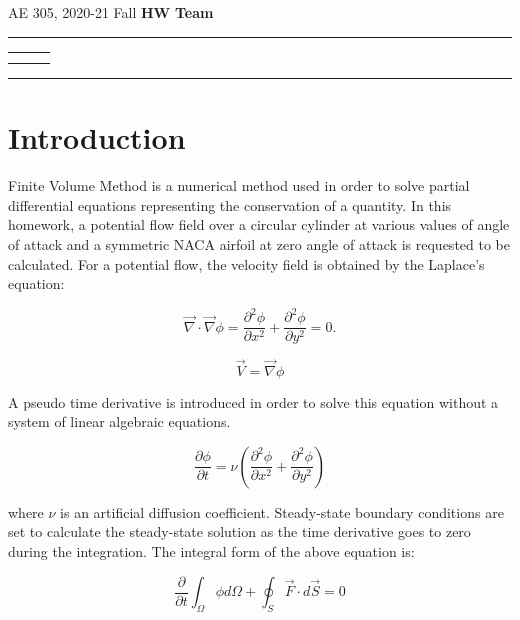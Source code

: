 \documentclass[letterpaper,12pt]{article}
\begin{document}
\begin{center}
AE 305, 2020-21 Fall \hfill \textbf{HW \HWno} \hfill \textbf{Team \TeamNo} \\
\noindent\rule{\textwidth}{0.4pt}
\begin{tabular}{p{} | p{} | p{} }
	\AuthorOneName&\AuthorTwoName&\AuthorThreeName\\
	\textit{\AuthorOneID}&\textit{\AuthorTwoID}&\textit{\AuthorThreeID}
\end{tabular}
\noindent\rule{\textwidth}{0.4pt}
\end{center}


\section{Introduction}
\label{section:intro}

Finite Volume Method is a numerical method used in order to solve partial differential
equations representing the conservation of a quantity. In this homework, a potential flow
field over a circular cylinder at various values of angle of attack and a symmetric NACA
airfoil at zero angle of attack is requested to be calculated. For a potential flow,
the velocity field is obtained by the Laplace's equation:

\begin{equation}
	\vec{\nabla} \cdot \vec{\nabla}\phi = \frac{\partial^2 \phi}{\partial x^2} + \frac{\partial^2 \phi}{\partial y^2} = 0.
\end{equation}

\begin{equation}
\vec{V} = \vec{\nabla}\phi
\end{equation}

A pseudo time derivative is introduced in order to solve this equation without a system
of linear algebraic equations.

\begin{equation}
	\frac{\partial \phi}{\partial t} = \nu \left(\frac{\partial^2 \phi}{\partial x^2} + \frac{\partial^2 \phi}{\partial y^2}\right)
\end{equation}

where $\nu$ is an artificial diffusion coefficient. Steady-state boundary conditions are
set to calculate the steady-state solution as the time derivative goes to zero during the
integration. The integral form of the above equation is:

\begin{equation}
	\frac{\partial}{\partial t} \int_{\Omega}\phi  d\Omega + \oint_{S} \vec{F} \cdot d\vec{S} = 0
\end{equation}
\end{document}
